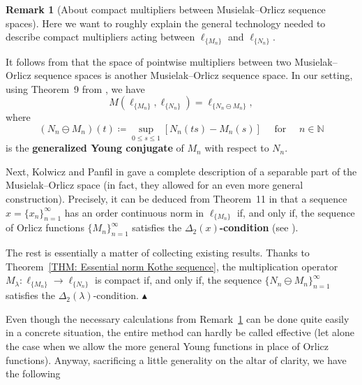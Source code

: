 \documentclass[11pt]{amsart}
\theoremstyle{definition}
\theoremstyle{definition}
\theoremstyle{definition}
\theoremstyle{definition}
\theoremstyle{definition}
\theoremstyle{definition}
\newtheorem{remark}[theorem]{Remark}
\theoremstyle{definition}
\theoremstyle{definition}
\numberwithin{equation}{section}
\numberwithin{equation}{section}
\numberwithin{equation}{section}
\theoremstyle{definition}
\theoremstyle{definition}
\theoremstyle{definition}
\theoremstyle{definition}
\theoremstyle{definition}
\theoremstyle{definition}
\newcommand\xqed[1]{%
	\leavevmode\unskip\penalty9999 \hbox{}\nobreak\hfill
	\quad\hbox{#1}}
\newcommand\demo{\xqed{{\Large $\blacktriangle$}}}
\begin{document}
	\begin{remark}[About compact multipliers between Musielak--Orlicz sequence spaces] \label{REMARK: compact multipliers MO}
		Here we want to roughly explain the general technology needed to describe compact multipliers
		acting between $\ell_{\{M_n\}}$ and $\ell_{\{N_n\}}$.
		
		It follows from \cite{LT21} that the space of pointwise multipliers between two Musielak--Orlicz
		sequence spaces is another Musielak--Orlicz sequence space.
		In our setting, using Theorem~9 from \cite{LT21}, we have
		\begin{equation*}
			M\left( \ell_{\{M_n\}}, \ell_{\{N_n\}} \right) = \ell_{\{N_n \ominus M_n\}},
		\end{equation*}
		where
		\begin{equation*}
			(N_n \ominus M_n)(t) \coloneqq \sup\limits_{0 \leqslant s \leqslant 1} [N_n(ts) - M_n(s)] \quad \text{ for } \quad n \in \mathbb{N}
		\end{equation*}
		is the {\bf generalized Young conjugate} of $M_n$ with respect to $N_n$.
		
		Next, Kolwicz and Panfil in \cite{KP12} gave a complete description of a separable part of the Musielak--Orlicz space
		(in fact, they allowed for an even more general construction).
		Precisely, it can be deduced from Theorem~11 in \cite{KP12} that a sequence $x = \{x_n\}_{n=1}^{\infty}$
		has an order continuous norm in $\ell_{\{M_n\}}$ if, and only if, the sequence of Orlicz functions $\{M_n\}_{n=1}^{\infty}$
		satisfies the {\bf $\Delta_2(x)$-condition} (see \cite[Definition~1]{KP12}).
		
		The rest is essentially a matter of collecting existing results. Thanks to Theorem~\ref{THM: Essential norm Kothe sequence},
		the multiplication operator $M_{\lambda} \colon \ell_{\{M_n\}} \rightarrow \ell_{\{N_n\}}$ is compact if, and only if,
		the sequence $\{ N_n \ominus M_n \}_{n=1}^{\infty}$ satisfies the $\Delta_2(\lambda)$-condition.
		\demo
	\end{remark}

 	Even though the necessary calculations from Remark~\ref{REMARK: compact multipliers MO} can be done quite easily in a concrete situation,
 	the entire method can hardly be called effective (let alone the case when we allow the more general Young functions in place of Orlicz functions).
 	Anyway, sacrificing a little generality on the altar of clarity, we have the following
	
\end{document}
